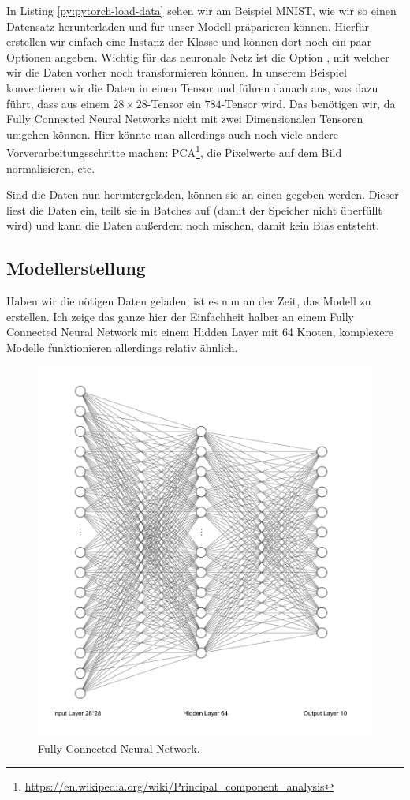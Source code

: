 
In Listing \ref{py:pytorch-load-data} sehen wir am Beispiel MNIST, wie wir so einen Datensatz herunterladen 
und für unser Modell präparieren können. Hierfür erstellen wir einfach eine 
Instanz der Klasse  und können dort noch ein paar Optionen angeben. 
Wichtig für das neuronale Netz ist die Option , mit welcher wir 
die Daten vorher noch transformieren können. In unserem Beispiel konvertieren wir die 
Daten in einen Tensor und führen danach  aus, was dazu führt, dass 
aus einem \(28 \times 28\)-Tensor ein \(784\)-Tensor wird.
Das benötigen wir, da Fully Connected Neural Networks nicht 
mit zwei Dimensionalen Tensoren umgehen können. 
Hier könnte man allerdings auch noch viele andere Vorverarbeitungsschritte machen: 
PCA\footnote{\url{https://en.wikipedia.org/wiki/Principal_component_analysis}}, die Pixelwerte auf dem Bild normalisieren, etc.

Sind die Daten nun heruntergeladen, können sie an einen  gegeben werden. 
Dieser liest die Daten ein, teilt sie in Batches auf (damit der Speicher nicht überfüllt wird) 
und kann die Daten außerdem noch mischen, damit kein Bias entsteht.

\subsection{Modellerstellung}
Haben wir die nötigen Daten geladen, ist es nun an der Zeit, das Modell zu erstellen. 
Ich zeige das ganze hier der Einfachheit halber an einem Fully Connected Neural Network 
mit einem Hidden Layer mit 64 Knoten, komplexere Modelle funktionieren allerdings relativ ähnlich. 

\begin{figure}[htbp]
    \centering
    \includegraphics[width=.6\textwidth]{figures/fcnn-28x28-64-10}
    \caption{Fully Connected Neural Network.}
    \label{fig:fcnn}
\end{figure}


